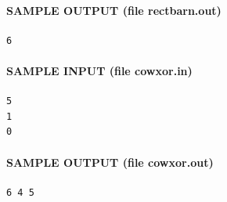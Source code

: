 \documentclass[11pt]{article}
\begin{document}
\paragraph{SAMPLE OUTPUT (file rectbarn.out)}
\begin{verbatim}
6
\end{verbatim}

\paragraph{SAMPLE INPUT (file cowxor.in)}
\begin{verbatim}
5
1
0
\end{verbatim}

\paragraph{SAMPLE OUTPUT (file cowxor.out)}
\begin{verbatim}
6 4 5
\end{verbatim}
\end{document}
